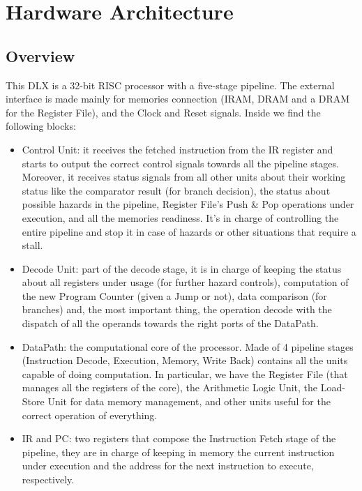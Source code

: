 \chapter{Hardware Architecture}

\section{Overview}

This DLX is a 32-bit RISC processor with a five-stage pipeline. The external interface is made mainly for memories connection (IRAM, DRAM and a DRAM for the Register File), and the Clock and Reset signals. Inside we find the following blocks:

\begin{itemize}
    \item Control Unit: it receives the fetched instruction from the IR register and starts to output the correct control signals towards all the pipeline stages. Moreover, it receives status signals from all other units about their working status like the comparator result (for branch decision), the status about possible hazards in the pipeline, Register File's Push \& Pop operations under execution, and all the memories readiness. It's in charge of controlling the entire pipeline and stop it in case of hazards or other situations that require a stall.
    \item Decode Unit: part of the decode stage, it is in charge of keeping the status about all registers under usage (for further hazard controls), computation of the new Program Counter (given a Jump or not), data comparison (for branches) and, the most important thing, the operation decode with the dispatch of all the operands towards the right ports of the DataPath.
    \item DataPath: the computational core of the processor. Made of 4 pipeline stages (Instruction Decode, Execution, Memory, Write Back) contains all the units capable of doing computation. In particular, we have the Register File (that manages all the registers of the core), the Arithmetic Logic Unit, the Load-Store Unit for data memory management, and other units useful for the correct operation of everything.
    \item IR and PC: two registers that compose the Instruction Fetch stage of the pipeline, they are in charge of keeping in memory the current instruction under execution and the address for the next instruction to execute, respectively. 
\end{itemize}


